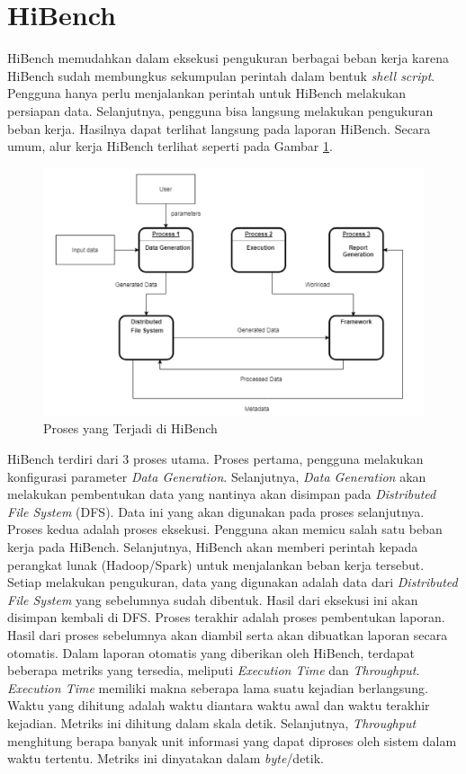 \section{HiBench}
HiBench memudahkan dalam eksekusi pengukuran berbagai beban kerja karena HiBench sudah membungkus sekumpulan perintah dalam bentuk \textit{shell script}\cite{samadiPerformanceComparisonHadoop2018}. Pengguna hanya perlu menjalankan perintah untuk HiBench melakukan persiapan data. Selanjutnya, pengguna bisa langsung melakukan pengukuran beban kerja. Hasilnya dapat terlihat langsung pada laporan HiBench. Secara umum, alur kerja HiBench terlihat seperti pada Gambar \ref{fig:hibench-process-flow}.

\begin{figure}[h]
    \centering
    \includegraphics[width=1\textwidth]{figures/ch02/hibench-flow}
    \caption{Proses yang Terjadi di HiBench \cite{barosenAnalysisComparisonInterfacing2018}}
    \label{fig:hibench-process-flow}
\end{figure}

HiBench terdiri dari 3 proses utama. Proses pertama, pengguna melakukan konfigurasi parameter \textit{Data Generation}. Selanjutnya, \textit{Data Generation} akan melakukan pembentukan data yang nantinya akan disimpan pada \textit{Distributed File System} (DFS). Data ini yang akan digunakan pada proses selanjutnya. Proses kedua adalah proses eksekusi. Pengguna akan memicu salah satu beban kerja pada HiBench. Selanjutnya, HiBench akan memberi perintah kepada perangkat lunak (Hadoop/Spark) untuk menjalankan beban kerja tersebut. Setiap melakukan pengukuran, data yang digunakan adalah data dari \textit{Distributed File System} yang sebelumnya sudah dibentuk. Hasil dari eksekusi ini akan disimpan kembali di DFS. Proses terakhir adalah proses pembentukan laporan. Hasil dari proses sebelumnya akan diambil serta akan dibuatkan laporan secara otomatis.
Dalam laporan otomatis yang diberikan oleh HiBench, terdapat beberapa metriks yang tersedia, meliputi \textit{Execution Time} dan \textit{Throughput}. \textit{Execution Time} memiliki makna seberapa lama suatu kejadian berlangsung. Waktu yang dihitung adalah waktu diantara waktu awal dan waktu terakhir kejadian. Metriks ini dihitung dalam skala detik. Selanjutnya, \textit{Throughput} menghitung berapa banyak unit informasi yang dapat diproses oleh sistem dalam waktu tertentu. Metriks ini dinyatakan dalam \textit{byte}/detik.


